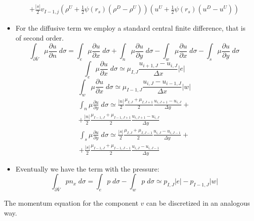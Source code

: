 \documentclass[12pt, a4paper]{article}
\begin{document}
\begin{itemize}
\begin{multline*}
	+\frac{|s|}{2}v_{I-1,j}(\rho^U+\frac{1}{2}\psi(r_s)(\rho^D-\rho^U))
	(u^U+\frac{1}{2}\psi(r_s)(u^D-u^U))
	\end{multline*}
	\item For the diffusive term we employ a standard central finite 
	difference, that is of second order.
	\begin{equation*}
\int_{\partial \bar{V}} \mu \frac{\partial u}{\partial 
	n} \; d\sigma = \int_e \mu \frac{\partial u}{\partial x} \; d\sigma
+ \int_n \mu \frac{\partial u}{\partial y} \; d\sigma
- \int_w \mu \frac{\partial u}{\partial x} \; d\sigma
- \int_s \mu \frac{\partial u}{\partial y} \; d\sigma
	\end{equation*}
	\begin{equation*}
	\int_e \mu \frac{\partial u}{\partial x} \; d\sigma \simeq \mu_{I,J} 
	\frac{u_{i+1,J} - u_{i,J}}{\Delta x} |e|
	\end{equation*}
	\begin{equation*}
	\int_w \mu \frac{\partial u}{\partial x} \; d\sigma \simeq \mu_{I-1,J} 
	\frac{u_{i,J} - u_{i-1,J}}{\Delta x} |w|
	\end{equation*}
	\begin{multline*}
	\int_n \mu \frac{\partial u}{\partial y} \; d\sigma \simeq \frac{|n|}{2} 
	\frac{\mu_{I,J}+\mu_{I,J+1}}{2}\frac{u_{i,J+1}-u_{i,J}}{\Delta y} +\\
+ \frac{|n|}{2} 
\frac{\mu_{I-1,J}+\mu_{I-1,J+1}}{2}\frac{u_{i,J+1}-u_{i,J}}{\Delta 
y}
	\end{multline*}
	\begin{multline*}
	\int_s \mu \frac{\partial u}{\partial y} \; d\sigma \simeq \frac{|s|}{2} 
	\frac{\mu_{I,J}+\mu_{I,J-1}}{2}\frac{u_{i,J}-u_{i,J-1}}{\Delta y} +\\
	+ \frac{|s|}{2} 
	\frac{\mu_{I-1,J}+\mu_{I-1,J-1}}{2}\frac{u_{i,J}-u_{i,J-1}}{\Delta y}
	\end{multline*}
	\item Eventually we have the term with the pressure:
	\begin{equation*}
	\int_{\partial \bar{V}} pn_x \; d\sigma = \int_e p \; d\sigma - \int_w p \; 
	d\sigma \simeq p_{I,J} |e| - p_{I-1,J} |w|
	\end{equation*}
\end{itemize}

The momentum equation for the component $v$ can be discretized in an analogous 
way.
\end{document}
